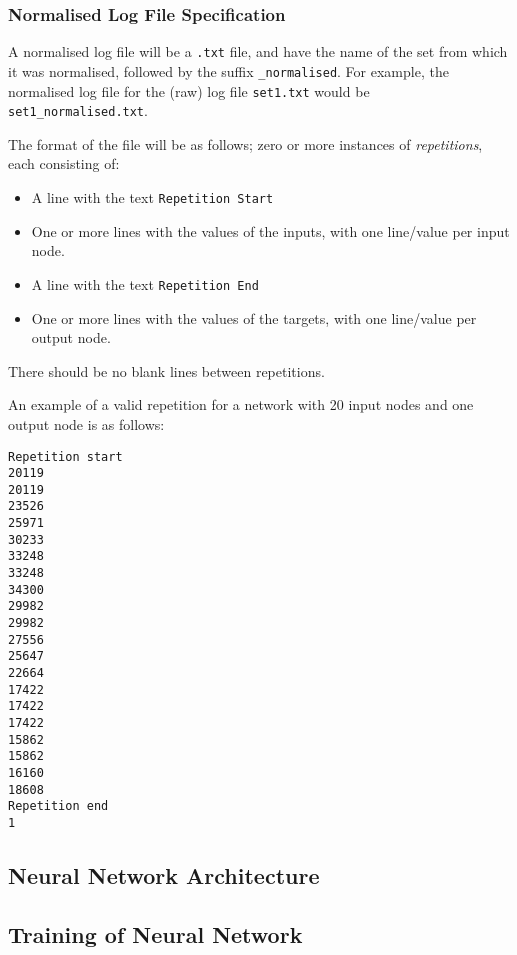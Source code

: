 \documentclass[a4paper]{article}
\begin{document}
\subsubsection{Normalised Log File Specification}

A normalised log file will be a \lstinline{.txt} file, and have the name of the set from which it was normalised, followed by the suffix \lstinline{_normalised}. For example, the normalised log file for the (raw) log file \lstinline{set1.txt} would be \lstinline{set1_normalised.txt}.

The format of the file will be as follows; zero or more instances of \emph{repetitions}, each consisting of:
\begin{itemize}
\item A line with the text \lstinline{Repetition Start}
\item One or more lines with the values of the inputs, with one line/value per input node.
\item A line with the text \lstinline{Repetition End}
\item One or more lines with the values of the targets, with one line/value per output node.
\end{itemize}

There should be no blank lines between repetitions.

An example of a valid repetition for a network with 20 input nodes and one output node is as follows:

\begin{lstlisting}
Repetition start
20119
20119
23526
25971
30233
33248
33248
34300
29982
29982
27556
25647
22664
17422
17422
17422
15862
15862
16160
18608
Repetition end
1
\end{lstlisting}

\subsection{Neural Network Architecture}%


\subsection{Training of Neural Network}%

\end{document}
